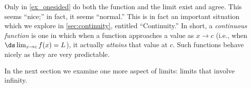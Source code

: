 Only in \autoref{ex_onesided} do both the function and the limit exist and agree. This seems ``nice;'' in fact, it seems ``normal.'' This is in fact an important situation which we explore in \autoref{sec:continuity}, entitled ``Continuity.'' In short, a \textit{continuous function} is one in which when a function approaches a value as $x\rightarrow c$ (i.e., when $\ds \lim_{x\to c} f(x) = L$), it actually \textit{attains} that value at $c$. Such functions behave nicely as they are very predictable.

In the next section we examine one more aspect of limits: limits that involve infinity.

